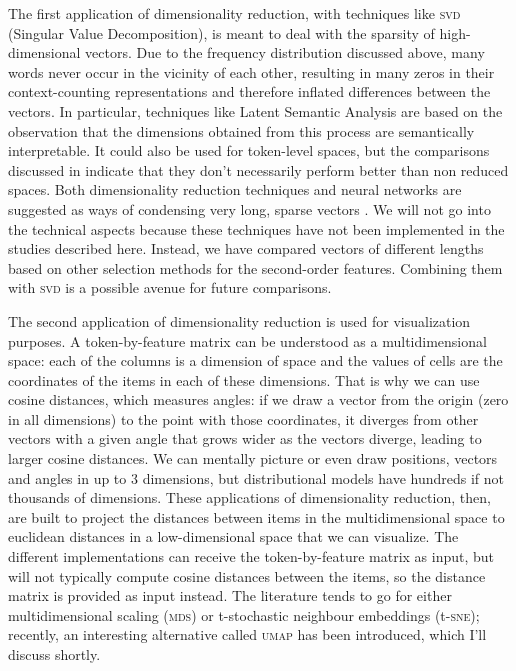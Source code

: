 \documentclass[
]{book}
\begin{document}
The first application of dimensionality reduction, with techniques like \textsc{svd} (Singular Value Decomposition), is meant to deal with the sparsity of high-dimensional vectors. Due to the frequency distribution discussed above, many words never occur in the vicinity of each other, resulting in many zeros in their context-counting representations and therefore inflated differences between the vectors. In particular, techniques like Latent Semantic Analysis \autocite{landauer.dumais_1997} are based on the observation that the dimensions obtained from this process are semantically interpretable.
It could also be used for token-level spaces, but the comparisons discussed in \textcite[246]{depascale_2019} indicate that they don't necessarily perform better than non reduced spaces.
Both dimensionality reduction techniques and neural networks are suggested as ways of condensing very long, sparse vectors \autocite{jurafsky.martin_2020,bolognesi_2020}.
We will not go into the technical aspects because these techniques have not been implemented in the studies described here. Instead, we have compared vectors of different lengths based on other selection methods for the second-order features. Combining them with \textsc{svd} is a possible avenue for future comparisons.

The second application of dimensionality reduction is used for visualization purposes. A token-by-feature matrix can be understood as a multidimensional space: each of the columns is a dimension of space and the values of cells are the coordinates of the items in each of these dimensions. That is why we can use cosine distances, which measures angles: if we draw a vector from the origin (zero in all dimensions) to the point with those coordinates, it diverges from other vectors with a given angle that grows wider as the vectors diverge, leading to larger cosine distances. We can mentally picture or even draw positions, vectors and angles in up to 3 dimensions, but distributional models have hundreds if not thousands of dimensions. These applications of dimensionality reduction, then, are built to project the distances between items in the multidimensional space to euclidean distances in a low-dimensional space that we can visualize. The different implementations can receive the token-by-feature matrix as input, but will not typically compute cosine distances between the items, so the distance matrix is provided as input instead.
The literature tends to go for either multidimensional scaling (\textsc{mds}) or t-stochastic neighbour embeddings (t-\textsc{sne}); recently, an interesting alternative called \textsc{umap} has been introduced, which I'll discuss shortly.
\end{document}
